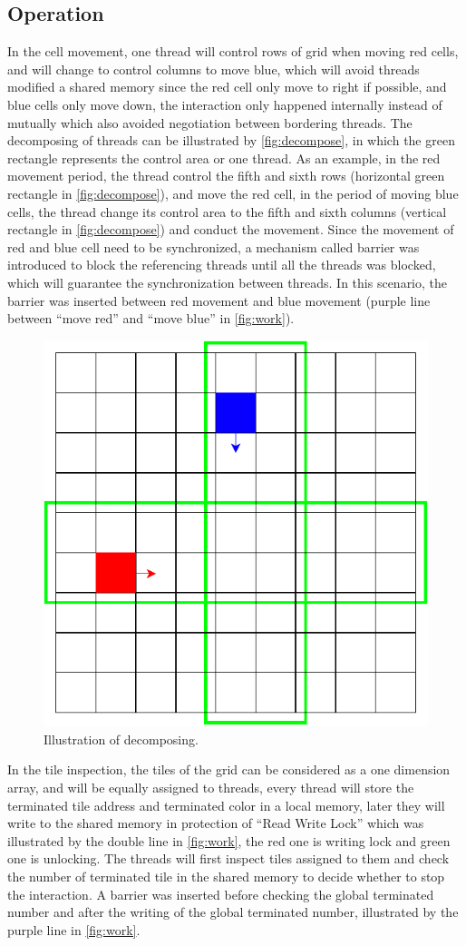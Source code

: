 \documentclass[12pt]{article}
\begin{document}
\subsection{Operation}
In the cell movement, one thread will control rows of grid when moving red cells, and will change to control columns to move blue, which will avoid threads modified a shared memory since the red cell only move to right if possible, and blue cells only move down, the interaction only happened internally instead of mutually which also avoided negotiation between bordering threads. The decomposing of threads can be illustrated by \autoref{fig:decompose}, in which the green rectangle represents the control area or one thread. As an example, in the red movement period, the thread control the fifth and sixth rows (horizontal green rectangle in \autoref{fig:decompose}), and move the red cell, in the period of moving blue cells, the thread change its control area to the fifth and sixth columns (vertical rectangle in \autoref{fig:decompose}) and conduct the movement. Since the movement of red and blue cell need to be synchronized, a mechanism called barrier was introduced to block the referencing threads until all the threads was blocked, which will guarantee the synchronization between threads. In this scenario, the barrier was inserted between red movement and blue movement (purple line between ``move red'' and ``move blue'' in \autoref{fig:work}).
\begin{figure}[ht]
    \centering
    \includegraphics[width = 0.48 \textwidth]{move.pdf}
    \caption{Illustration of decomposing.}
    \label{fig:decompose}
\end{figure}

In the tile inspection, the tiles of the grid can be considered as a one dimension array, and will be equally assigned to threads, every thread will store the terminated tile address and terminated color in a local memory, later they will write to the shared memory in protection of ``Read Write Lock'' which was illustrated by the double line in \autoref{fig:work}, the red one is writing lock and green one is unlocking. The threads will first inspect tiles assigned to them and check the number of terminated tile in the shared memory to decide whether to stop the interaction. A barrier was inserted before checking the global terminated number and after the writing of the global terminated number, illustrated by the purple line in \autoref{fig:work}.
\end{document}
